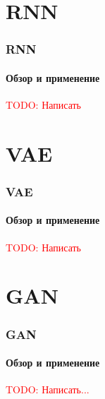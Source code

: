 \documentclass[10pt]{beamer}
\newcommand\TODO[1]{\textcolor{red}{{\Large TODO: #1}}}
\begin{document}
\section{RNN}
\begin{frame}
\frametitle{RNN}
\framesubtitle{Обзор и применение}

\TODO{Написать}

\end{frame}
\section{VAE}
\begin{frame}
\frametitle{VAE}
\framesubtitle{Обзор и применение}

\TODO{Написать}

\end{frame}
\section{GAN}
\begin{frame}
\frametitle{GAN}
\framesubtitle{Обзор и применение}

\TODO{Написать...}

\end{frame}
\end{document}
